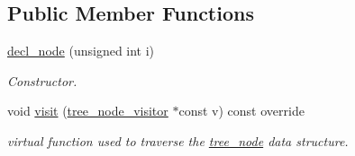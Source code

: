 \subsection*{Public Member Functions}
\begin{DoxyCompactItemize}
\item 
\hyperlink{structdecl__node_a14d187de2ad8c1774eaaaae13f0441da}{decl\+\_\+node} (unsigned int i)
\begin{DoxyCompactList}\small\item\em Constructor. \end{DoxyCompactList}\item 
void \hyperlink{structdecl__node_a9e63331f0c35d9af9d1997afafe9152a}{visit} (\hyperlink{classtree__node__visitor}{tree\+\_\+node\+\_\+visitor} $\ast$const v) const override
\begin{DoxyCompactList}\small\item\em virtual function used to traverse the \hyperlink{classtree__node}{tree\+\_\+node} data structure. \end{DoxyCompactList}\end{DoxyCompactItemize}
